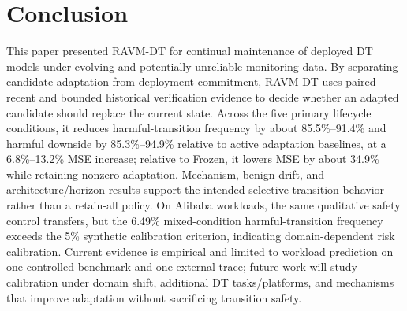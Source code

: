 \section{Conclusion}
\label{sec:conclusion}
This paper presented RAVM-DT for continual maintenance of deployed DT models under evolving and potentially unreliable monitoring data. By separating candidate adaptation from deployment commitment, RAVM-DT uses paired recent and bounded historical verification evidence to decide whether an adapted candidate should replace the current state. Across the five primary lifecycle conditions, it reduces harmful-transition frequency by about 85.5\%--91.4\% and harmful downside by 85.3\%--94.9\% relative to active adaptation baselines, at a 6.8\%--13.2\% MSE increase; relative to Frozen, it lowers MSE by about 34.9\% while retaining nonzero adaptation. Mechanism, benign-drift, and architecture/horizon results support the intended selective-transition behavior rather than a retain-all policy. On Alibaba workloads, the same qualitative safety control transfers, but the 6.49\% mixed-condition harmful-transition frequency exceeds the 5\% synthetic calibration criterion, indicating domain-dependent risk calibration. Current evidence is empirical and limited to workload prediction on one controlled benchmark and one external trace; future work will study calibration under domain shift, additional DT tasks/platforms, and mechanisms that improve adaptation without sacrificing transition safety.
